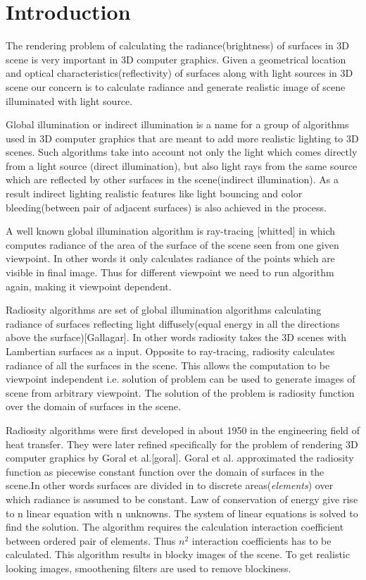 \documentclass[12pt]{article}
\begin{document}
\section{Introduction}

The rendering problem of calculating the radiance(brightness) of surfaces in 3D scene is very important in 3D computer graphics. Given a geometrical location and optical characteristics(reflectivity) of surfaces along with light sources in 3D scene our concern is to calculate radiance and generate realistic image of scene illuminated with light source.

Global illumination or indirect illumination is a name for a group of algorithms used in 3D computer graphics that are meant to add more realistic lighting to 3D scenes. Such algorithms take into account not only the light which comes directly from a light source (direct illumination), but also light rays from the same source which are reflected by other surfaces in the scene(indirect illumination).
As a result indirect lighting realistic features like light bouncing and color bleeding(between pair of adjacent surfaces) is also achieved in the process.

A well known global illumination algorithm is ray-tracing [whitted] in which computes  radiance of the area of the surface of the scene
seen from one given viewpoint. In other words it only calculates radiance of the points which are visible in final image. Thus for different viewpoint we need to run algorithm again, making it viewpoint dependent.

Radiosity algorithms are set of global illumination algorithms calculating radiance of surfaces reflecting light diffusely(equal energy in all the directions above the surface)[Gallagar]. In other words radiosity takes the 3D scenes with Lambertian surfaces as a input. Opposite to ray-tracing, radiosity calculates radiance of all the surfaces in the scene. This allows the computation to be viewpoint independent i.e. solution of problem can be used to generate images of scene from arbitrary viewpoint. The solution of the problem is radiosity function over the domain of surfaces in the scene.

Radiosity algorithms were first developed in about 1950 in the engineering field of heat transfer. They were later refined specifically for the problem of rendering 3D computer graphics by Goral et al.[goral]. Goral et al. approximated the radiosity function as piecewise constant function over the domain of surfaces in the scene.In other words surfaces are divided in to discrete areas({\em elements}) over which radiance is assumed to be constant. Law of conservation of energy give rise to n linear equation with n unknowns. The system of linear equations is solved to find the solution. The algorithm requires the calculation interaction coefficient between ordered pair of elements. Thus $n^2$ interaction coefficients has to be calculated. This algorithm results in blocky images of the scene. To get realistic looking images, smoothening filters are used to remove blockiness. 
\end{document}
